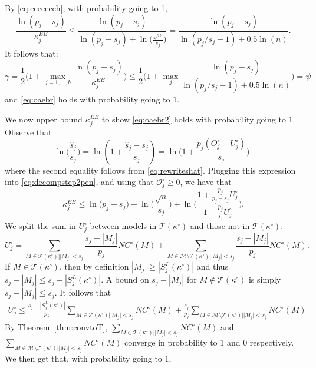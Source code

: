 \documentclass[
  12pt]{article}
\newcommand{\M}{\mathcal{M}}
\newcommand{\T}{\mathcal{T}}
\newcommand{\OO}{\mathcal{O}}
\begin{document}
By \eqref{eq:eeeeeeeh}, with probability going to 1,
$$ \frac{\ln(p_j-s_j)}{\kappa^{EB}_j}
    \leq \frac{\ln(p_j-s_j)}{\ln(p_j-s_j)+\ln\Big(\frac{\sqrt{n}}{s_j}\Big)} =  \frac{\ln(p_j-s_j)}{\ln(p_j/s_j-1)+0.5\ln(n)} .$$
It follows that:
\begin{equation*}
    \gamma=\frac12\Big(1+\max_{j=1, \ldots,b}\frac{\ln(p_j-s_j)}{\kappa^{EB}_j}\Big) \leq \frac12\Big(1+\max_j \frac{\ln(p_j-s_j)}{\ln(p_j/s_j-1)+0.5\ln(n)}\Big)=\psi
\end{equation*}
and \eqref{eq:oaebr} holds with probability going to 1.

We now upper bound $\kappa^{EB}_j$ to show \eqref{eq:oaebr2} holds with probability going to 1. Observe that 
$$
\ln\Big(\frac{\hat{s}_j}{s_j}\Big)=
 \ln \left( 1 + \frac{\hat{s}_j - s_j}{s_j}\right) =   
\ln\Big(1+\frac{p_j(O^{\circ}_j-U^{\circ}_j)}{s_j}\Big).
$$
where the second equality follows from \eqref{eq:rewriteshat}.
Plugging this expression into \eqref{eq:decompstep2pen}, and using that $\OO_j^{\circ} \geq 0$, we have that  %
\begin{equation}\label{eq:gggggggg}
    \kappa^{EB}_j \leq \ln\big(p_j-s_j\big)+\ln\Big(\frac{\sqrt{n}}{s_j}\Big)+\ln\bigg(\frac{1+\frac{p_j}{p_j-s_j}U^{\circ}_j}{1-\frac{p_j}{s_j}U^{\circ}_j}\bigg).
\end{equation}
We split the sum in $U^{\circ}_j$ between models in $\T(\kappa^{\circ})$ and those not in $\T(\kappa^{\circ})$. 
$$U_j^{\circ} = \sum_{M \in \T(\kappa^{\circ}) | |M_j| < s_j}\frac{s_j-|M_j|}{p_j}NC^{\circ}(M)+\sum_{M \in \M\setminus\T(\kappa^{\circ}) | |M_j| < s_j}\frac{s_j-|M_j|}{p_j}NC^{\circ}(M).
$$
If $M\in \T(\kappa^{\circ})$, then by definition $|M_j|\geq |S^{L}_j(\kappa^{\circ})|$ and thus $s_j-|M_j|\leq s_j-|S^{L}_j(\kappa^{\circ})|$. A bound on $s_j-|M_j|$ for $M\not\in \T(\kappa^{\circ})$ is simply $s_j-|M_j|\leq s_j$. It follows that
\begin{eqnarray*}
    U^{\circ}_j \leq \frac{s_j-|S^{L}_j(\kappa^{\circ})|}{p_j}\sum_{M \in \T(\kappa^{\circ}) | |M_j| < s_j}NC^{\circ}(M)+  \frac{s_j}{p_j}\sum_{M \in \M \setminus \T(\kappa^{\circ})| |M_j| < s_j}NC^{\circ}(M)
\end{eqnarray*}
By Theorem~\ref{thm:convtoT}, $\sum_{M \in  \T(\kappa^{\circ})| |M_j| < s_j}NC^{\circ}(M)$ and $\sum_{M \in \M \setminus \T(\kappa^{\circ})| |M_j| < s_j}NC^{\circ}(M)$ converge in probability to 1 and 0 respectively. We then get that, with probability going to 1,
\end{document}
